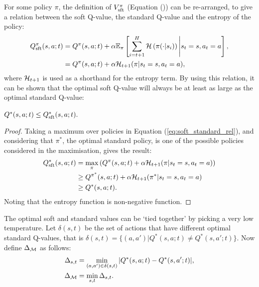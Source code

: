 
    For some policy $\pi$, the definition of $V^{\pi}_{{\textnormal{sft}}}$ (Equation ()) can be re-arranged, to give a relation between the soft Q-value, the standard Q-value and the entropy of the policy:
    \begin{align}
        Q^{\pi}_{{\textnormal{sft}}}(s,a;t) &= Q^{\pi}(s,a;t) 
            + \alpha \mathbb{E}_{\pi}\left[
                \sum_{i=t+1}^H \mathcal{H}\left(\pi(\cdot|s_i)\right) \Bigg| s_t=s, a_t=a
                \right],  \\
            &= Q^{\pi}(s,a;t) 
            + \alpha\mathcal{H}_{t+1}(\pi|s_t=s,a_t=a), \label{eq:soft_standard_rel}
    \end{align}
    where $\mathcal{H}_{t+1}$ is used as a shorthand for the entropy term. By using this relation, it can be shown that the optimal soft Q-value will always be at least as large as the optimal standard Q-value:
    \begin{lemma} \label{lem:soft_geq_standard}
        $Q^*(s,a;t) \leq Q_{\textnormal{sft}}^*(s,a;t).$
    \end{lemma}
    \begin{proof}
        Taking a maximum over policies in Equation (\ref{eq:soft_standard_rel}), and considering that $\pi^*$, the optimal standard policy, is one of the possible policies considered in the maximisation, gives the result:
        \begin{align}
            Q_{{\textnormal{sft}}}^*(s,a;t) &= \max_\pi \left(Q^{\pi}(s,a;t) + \alpha\mathcal{H}_{t+1}(\pi|s_t=s,a_t=a)\right) \\
                &\geq Q^{\pi^*}(s,a;t) + \alpha\mathcal{H}_{t+1}(\pi^*|s_t=s,a_t=a) \\
                &\geq Q^*(s,a;t).
        \end{align} 
        Noting that the entropy function is non-negative function.
    \end{proof}








    The optimal soft and standard values can be `tied together' by picking a very low temperature. Let $\delta(s,t)$ be the set of actions that have different optimal standard Q-values, that is $\delta(s,t)=\{(a,a')|Q^*(s,a;t)\neq Q^*(s,a';t)\}$. Now define $\Delta_{\mathcal{M}}$ as follows:
    \begin{align}
        \Delta_{s,t} &= \min_{(a,a')\in\delta(s,t)} |Q^*(s,a;t)-Q^*(s,a';t)|, \\
        \Delta_{\mathcal{M}} &= \min_{s,t} \Delta_{s,t}. \label{eq:delta}
    \end{align}

